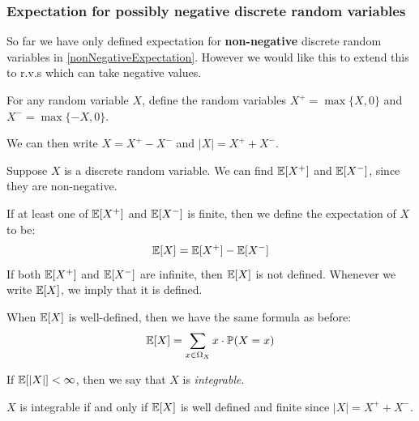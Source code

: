 \documentclass[../main.tex]{subfiles}
\begin{document}
\subsubsection{Expectation for possibly negative discrete random variables}
\label{negativeExpectation}
So far we have only defined expectation for \textbf{non-negative} discrete random variables in \cref{nonNegativeExpectation}.
However we would like this to extend this to r.v.s which can take negative values.
\begin{remark}[Notation]
  For any random variable $X$, define the random variables $X^{+} = \max\{X, 0\}$ and $X^{-} = \max\{-X, 0\}$.

  We can then write $X = X^{+} - X^{-}$ and $|X| = X^{+} + X^{-}$.
\end{remark}
Suppose $X$ is a discrete random variable.
We can find $\mathbb{E}[X^{+}]$ and $\mathbb{E}[X^{-}]$, since they are non-negative.
\begin{definition}
  If at least one of $\mathbb{E}[X^{+}]$ and $\mathbb{E}[X^{-}]$ is finite, then we define the expectation of $X$ to be:
  \[
    \mathbb{E}[X] = \mathbb{E}[X^{+}] - \mathbb{E}[X^{-}]
  \]
  If both $\mathbb{E}[X^{+}]$ and $\mathbb{E}[X^{-}]$ are infinite, then $\mathbb{E}[X]$ is not defined.
  Whenever we write $\mathbb{E}[X]$, we imply that it is defined.
\end{definition}
When $\mathbb{E}[X]$ is well-defined, then we have the same formula as before:
\[
  \mathbb{E}[X] = \sum_{x \in \Omega_X} x \cdot \mathbb{P}(X = x)
\]
\begin{definition}
  If $\mathbb{E}[|X|] < \infty$, then we say that $X$ is \textit{integrable}.
\end{definition}
\begin{remark}
  $X$ is integrable if and only if $\mathbb{E}[X]$ is well defined and finite since $|X| = X^{+} + X^{-}$.
\end{remark}
\end{document}
